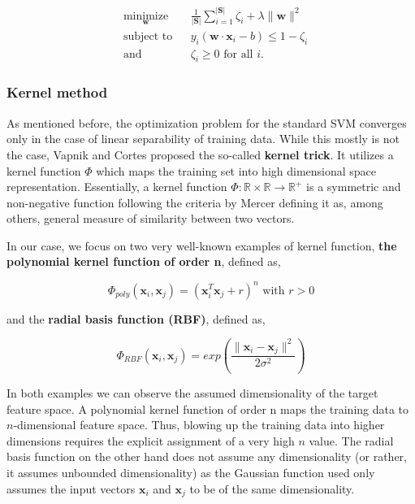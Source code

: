 \documentclass[pdftex,12pt,a4paper]{report}
\begin{document}
\begin{equation*}
\begin{aligned}
& \underset{\mathbf{
w}}{\text{minimize}}
& & \frac{1}{\vert \mathbf{S} \vert} \sum_{i=1}^{\vert \mathbf{S} \vert} \zeta_i + \lambda \| \mathbf{w} \|^2 \\
& \text{subject to}
& & y_i (\mathbf{w} \cdot \mathbf{x}_i - b) \leq 1 - \zeta_i \\
& \text{and} && \zeta_i \geq 0 \text{ for all } i.
\end{aligned}
\end{equation*}

\subsubsection*{Kernel method}

As mentioned before, the optimization problem for the standard SVM converges only in the case of linear separability of training data. While this mostly is not the case, Vapnik and Cortes \cite{cortes1995support} proposed the so-called \textbf{kernel trick}. It utilizes a kernel function $\Phi$ which maps the training set into high dimensional space representation. Essentially, a kernel function $\Phi: \mathbb{R} \times \mathbb{R} \rightarrow \mathbb{R}^+$ is a symmetric and non-negative function following the criteria by Mercer \cite{mercer1909functions} defining it as, among others, general measure of similarity between two vectors.

In our case, we focus on two very well-known examples of kernel function, \textbf{the polynomial kernel function of order n}, defined as,

\begin{equation}
\Phi_{poly}(\mathbf{x}_i, \mathbf{x}_j) = \left(\mathbf{x}_i^T \mathbf{x}_j + r \right)^n \text{ with } r > 0
\label{eq:svm_quad}
\end{equation} 

and the \textbf{radial basis function (RBF)}, defined as,

\begin{equation}
\Phi_{RBF}(\mathbf{x}_i, \mathbf{x}_j) = exp\left(\frac{\| \mathbf{x}_i - \mathbf{x}_j \|^2}{2 \sigma^2}\right)
\label{eq:svm_rbf}
\end{equation}

In both examples we can observe the assumed dimensionality of the target feature space. A polynomial kernel function of order n maps the training data to $n$-dimensional feature  space. Thus, blowing up the training data into higher dimensions requires the explicit assignment of a very high $n$ value. The  radial basis function on the other hand does not assume any dimensionality (or rather, it assumes unbounded dimensionality) as the Gaussian function used only assumes the input vectors $\mathbf{x}_i$ and $\mathbf{x}_j$ to be of the same dimensionality. 
\end{document}
